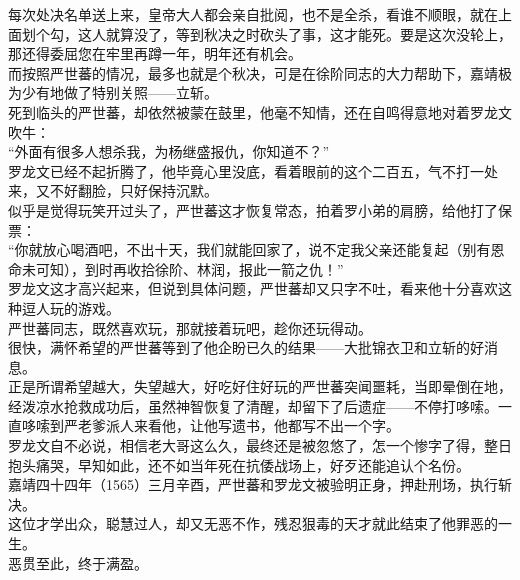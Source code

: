 \begin{multicols}{\theparacolNo}
每次处决名单送上来，皇帝大人都会亲自批阅，也不是全杀，看谁不顺眼，就在上面划个勾，这人就算没了，等到秋决之时砍头了事，这才能死。要是这次没轮上，那还得委屈您在牢里再蹲一年，明年还有机会。\\

而按照严世蕃的情况，最多也就是个秋决，可是在徐阶同志的大力帮助下，嘉靖极为少有地做了特别关照——立斩。\\

死到临头的严世蕃，却依然被蒙在鼓里，他毫不知情，还在自鸣得意地对着罗龙文吹牛：\\

“外面有很多人想杀我，为杨继盛报仇，你知道不？”\\

罗龙文已经不起折腾了，他毕竟心里没底，看着眼前的这个二百五，气不打一处来，又不好翻脸，只好保持沉默。\\

似乎是觉得玩笑开过头了，严世蕃这才恢复常态，拍着罗小弟的肩膀，给他打了保票：\\

“你就放心喝酒吧，不出十天，我们就能回家了，说不定我父亲还能复起（别有恩命未可知），到时再收拾徐阶、林润，报此一箭之仇！”\\

罗龙文这才高兴起来，但说到具体问题，严世蕃却又只字不吐，看来他十分喜欢这种逗人玩的游戏。\\

严世蕃同志，既然喜欢玩，那就接着玩吧，趁你还玩得动。\\

很快，满怀希望的严世蕃等到了他企盼已久的结果——大批锦衣卫和立斩的好消息。\\

正是所谓希望越大，失望越大，好吃好住好玩的严世蕃突闻噩耗，当即晕倒在地，经泼凉水抢救成功后，虽然神智恢复了清醒，却留下了后遗症——不停打哆嗦。一直哆嗦到严老爹派人来看他，让他写遗书，他都写不出一个字。\\

罗龙文自不必说，相信老大哥这么久，最终还是被忽悠了，怎一个惨字了得，整日抱头痛哭，早知如此，还不如当年死在抗倭战场上，好歹还能追认个名份。\\

嘉靖四十四年（1565）三月辛酉，严世蕃和罗龙文被验明正身，押赴刑场，执行斩决。\\

这位才学出众，聪慧过人，却又无恶不作，残忍狠毒的天才就此结束了他罪恶的一生。\\

恶贯至此，终于满盈。\\


\end{multicols}
